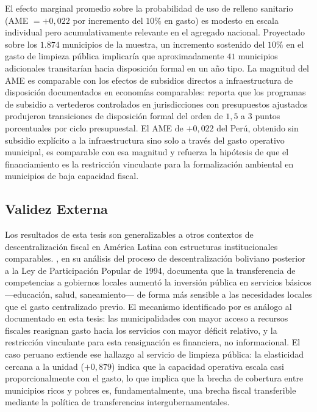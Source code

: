 El efecto marginal promedio sobre la probabilidad de uso de relleno sanitario (AME $= +0{,}022$ por incremento del $10\%$ en gasto) es modesto en escala individual pero acumulativamente relevante en el agregado nacional. Proyectado sobre los $1{.}874$ municipios de la muestra, un incremento sostenido del $10\%$ en el gasto de limpieza pública implicaría que aproximadamente $41$ municipios adicionales transitarían hacia disposición formal en un año tipo. La magnitud del AME es comparable con los efectos de subsidios directos a infraestructura de disposición documentados en economías comparables: \citet{Kinnaman2006} reporta que los programas de subsidio a vertederos controlados en jurisdicciones con presupuestos ajustados produjeron transiciones de disposición formal del orden de $1{,}5$ a $3$ puntos porcentuales por ciclo presupuestal. El AME de $+0{,}022$ del Perú, obtenido sin subsidio explícito a la infraestructura sino solo a través del gasto operativo municipal, es comparable con esa magnitud y refuerza la hipótesis de que el financiamiento es la restricción vinculante para la formalización ambiental en municipios de baja capacidad fiscal.

\subsection{Validez Externa}
\label{sec:validez_externa}

Los resultados de esta tesis son generalizables a otros contextos de descentralización fiscal en América Latina con estructuras institucionales comparables.
\citet{Faguet2004}, en su análisis del proceso de descentralización boliviano posterior a la Ley de Participación Popular de 1994, documenta que la transferencia de competencias a gobiernos locales aumentó la inversión pública en servicios básicos ---educación, salud, saneamiento--- de forma más sensible a las necesidades locales que el gasto centralizado previo.
El mecanismo identificado por \citet{Faguet2004} es análogo al documentado en esta tesis: las municipalidades con mayor acceso a recursos fiscales reasignan gasto hacia los servicios con mayor déficit relativo, y la restricción vinculante para esta reasignación es financiera, no informacional.
El caso peruano extiende ese hallazgo al servicio de limpieza pública: la elasticidad cercana a la unidad ($+0{,}879$) indica que la capacidad operativa escala casi proporcionalmente con el gasto, lo que implica que la brecha de cobertura entre municipios ricos y pobres es, fundamentalmente, una brecha fiscal transferible mediante la política de transferencias intergubernamentales.

